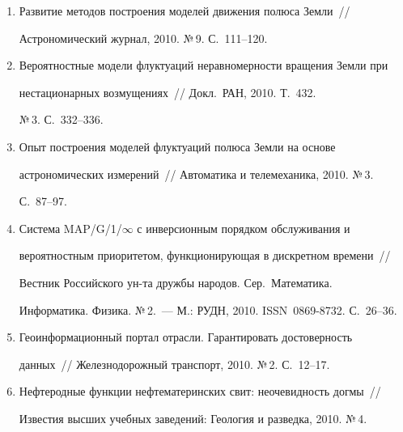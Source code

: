 \begin{enumerate}[1.]
сейсмического процесса~/\!\!/  Докл.\ РАН, 2010. Т.~435. №\,3. 


С.~1--5.


\item {}


Развитие методов построения моделей движения полюса Земли~/\!\!/  


Астрономический журнал, 2010. №\,9. С.~111--120.


\item {}


Вероятностные модели флуктуаций неравномерности вращения Земли при 


нестационарных возмущениях~/\!\!/  Докл.\ РАН, 2010. Т.~432. 


№\,3. С.~332--336.


\item {}


Опыт построения моделей флуктуаций полюса Земли на основе 


астрономических измерений~/\!\!/  Автоматика и телемеханика, 2010. №\,3. 


С.~87--97.


\item {}


Система MAP/G/1/$\infty$ с инверсионным порядком обслуживания и 


вероятностным приоритетом, функционирующая в дискретном времени~/\!\!/  


Вестник Российского ун-та дружбы народов. Сер.\ Математика. 


Информатика. Физика. №\,2.~--- М.: РУДН, 2010. ISSN~0869-8732. С.~26--36.


\item {}


Геоинформационный портал отрасли. Гарантировать достоверность 


данных~/\!\!/  Железнодорожный транспорт, 2010. №\,2. С.~12--17.


\item {}


Нефтеродные функции нефтематеринских свит: неочевидность догмы~/\!\!/  


Известия высших учебных заведений: Геология и разведка, 2010. №\,4. 



\end{enumerate}
